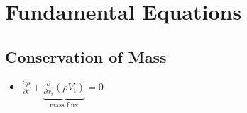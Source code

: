 \documentclass[a4paper]{article}
\begin{document}
\newcommand\barbelow[1]{\stackunder[1.2pt]{$#1$}{\rule{.8ex}{.075ex}}}
\newcommand\partderiv[2]{\frac{\partial #1}{\partial #2}}
\newcommand\partderivtwo[2]{\frac{\partial^2 #1}{\partial^2 #2}}
\newcommand\matderiv[2]{\frac{D #1}{D #2}}
\newcommand\kdel[1]{\delta_{#1}}
\newcommand\half{\frac{1}{2}}

\newcommand\hcancel[2][black]{\setbox0=\hbox{$#2$}%
\rlap{\raisebox{.45\ht0}{\textcolor{#1}{\rule{\wd0}{1pt}}}}#2}  



\section{Fundamental Equations}
    \subsection{Conservation of Mass}
        \begin{itemize}
        \item $\partderiv{\rho}{t} + \underbrace{\partderiv{}{x_i}\left( \rho V_i \right)}_{\text{mass flux}} = 0$
        \end{itemize}
\end{document}
